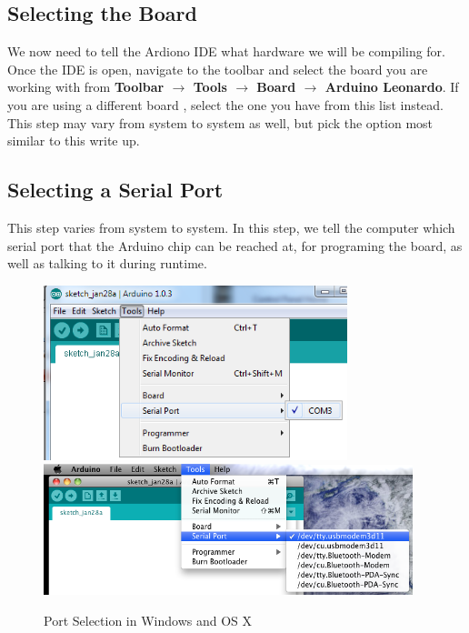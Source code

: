 \documentclass[11pt,a4paper]{article}
\begin{document}

\subsection{Selecting the Board} %
\label{sub:selecting_the_board}
We now need to tell the Ardiono IDE what hardware we will be compiling for. Once the IDE is open, navigate to the toolbar and select the board you are working with from \textbf{Toolbar $\rightarrow$ Tools $\rightarrow$ Board $\rightarrow$ Arduino Leonardo}.  If you are using a different board , select the one you have from this list instead.  This step may vary from system to system as well, but pick the option most similar to this write up.


\subsection{Selecting a Serial Port} %

\label{sub:selecting_a_serial_port}
This step varies from system to system.  In this step, we tell the computer which serial port that the Arduino chip can be reached at, for programing the board, as well as talking to it during runtime.
    \begin{figure}[htbp]
        \centering
            \includegraphics[height=2in]{figures/port-windows.png}
            \includegraphics[height=1.5in]{figures/port-osx.png}
        \caption{Port Selection in Windows and OS X}
        \label{fig:figures_port}
    \end{figure}
\end{document}
